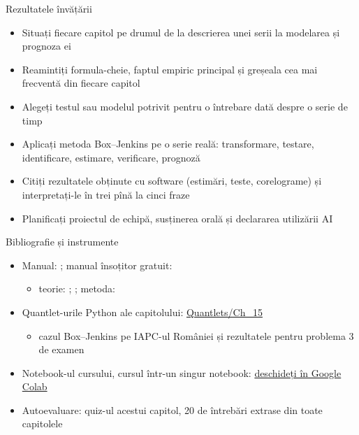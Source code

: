 \begin{frame}{Rezultatele învățării}
\itemsize{\small}
\begin{itemize}
    \item Situați fiecare capitol pe drumul de la descrierea unei serii la modelarea și prognoza ei
    \item Reamintiți formula-cheie, faptul empiric principal și greșeala cea mai frecventă din fiecare capitol
    \item Alegeți testul sau modelul potrivit pentru o întrebare dată despre o serie de timp
    \item Aplicați metoda Box--Jenkins pe o serie reală: transformare, testare, identificare, estimare, verificare, prognoză
    \item Citiți rezultatele obținute cu software (estimări, teste, corelograme) și interpretați-le în trei pînă la cinci fraze
    \item Planificați proiectul de echipă, susținerea orală și declararea utilizării AI
\end{itemize}
\end{frame}

\begin{frame}{Bibliografie și instrumente}
\itemsize{\small}
\begin{itemize}
    \item Manual: ; manual însoțitor gratuit: 
    \begin{itemize}
        \item teorie: ; ; metoda: 
    \end{itemize}
    \item Quantlet-urile Python ale capitolului: \href{https://github.com/danpele/Time-Series-Analysis/tree/main/Quantlets/Ch_15}{Quantlets/Ch\_15}
    \begin{itemize}
        \item cazul Box--Jenkins pe IAPC-ul României și rezultatele pentru problema 3 de examen
    \end{itemize}
    \item Notebook-ul cursului, cursul într-un singur notebook: \href{\colaburl{notebooks/EN/chapter15_lecture_notebook.ipynb}}{deschideți în Google Colab}
    \item Autoevaluare: quiz-ul acestui capitol, 20 de întrebări extrase din toate capitolele
\end{itemize}
\end{frame}


